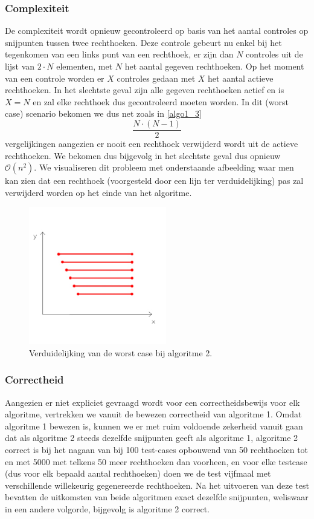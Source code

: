 \documentclass{article}
\begin{document}
\newpage
\subsubsection{Complexiteit}
\label{algo2_3}
De complexiteit wordt opnieuw gecontroleerd op basis van het aantal controles op snijpunten tussen twee rechthoeken. Deze controle gebeurt nu enkel bij het tegenkomen van een links punt van een rechthoek, er zijn dan $N$ controles uit de lijst van $2\cdot N$ elementen, met $N$ het aantal gegeven rechthoeken. Op het moment van een controle worden er $X$ controles gedaan met $X$ het aantal actieve rechthoeken. In het slechtste geval zijn alle gegeven rechthoeken actief en is $X = N$ en zal elke rechthoek dus gecontroleerd moeten worden. In dit (worst case) scenario bekomen we dus net zoals in \ref{algo1_3}
\[ \frac{N \cdot (N-1)}{2}\]
vergelijkingen aangezien er nooit een rechthoek verwijderd wordt uit de actieve rechthoeken. We bekomen dus bijgevolg in het slechtste geval dus opnieuw $\mathcal{O}(n^2)$. We visualiseren dit probleem met onderstaande afbeelding waar men kan zien dat een rechthoek (voorgesteld door een lijn ter verduidelijking) pas zal verwijderd worden op het einde van het algoritme.


\begin{figure}[H]
\centering
\includegraphics[width=6cm,height=6cm,keepaspectratio]{algo2_problem}
\caption{Verduidelijking van de worst case bij algoritme 2.}
\end{figure}

\subsubsection{Correctheid}
\label{algo2_4}
Aangezien er niet expliciet gevraagd wordt voor een correctheidsbewijs voor elk algoritme, vertrekken we vanuit de bewezen correctheid van algoritme 1. Omdat algoritme 1 bewezen is, kunnen we er met ruim voldoende zekerheid vanuit gaan dat als algoritme 2 steeds dezelfde snijpunten geeft als algoritme 1, algoritme 2 correct is bij het nagaan van bij 100 test-cases opbouwend van 50 rechthoeken tot en met 5000 met telkens 50 meer rechthoeken dan voorheen, en voor elke testcase (dus voor elk bepaald aantal rechthoeken) doen we de test vijfmaal met verschillende willekeurig gegenereerde rechthoeken.
Na het uitvoeren van deze test bevatten de uitkomsten van beide algoritmen exact dezelfde snijpunten, weliswaar in een andere volgorde, bijgevolg is algoritme 2 correct.
\end{document}
